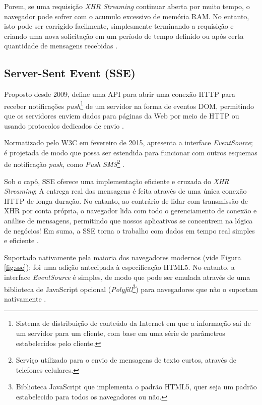 Porem, se uma requisição \emph{XHR Streaming} continuar aberta por muito tempo, o navegador pode sofrer com o acumulo excessivo de memória RAM. No entanto, isto pode ser corrigido facilmente, simplesmente terminando a requisição e criando uma nova solicitação em um período de tempo definido ou após certa quantidade de mensagens recebidas \cite{souders2009even}.

\subsection{Server-Sent Event (SSE)}

Proposto desde 2009, define uma API para abrir uma conexão HTTP para receber notificações \emph{push}\footnote{Sistema de distribuição de conteúdo da Internet em que a informação sai de um servidor para um cliente, com base em uma série de parâmetros estabelecidos pelo cliente.} de um servidor na forma de eventos DOM, permitindo que os servidores enviem dados para páginas da Web por meio de HTTP ou usando protocolos dedicados de envio \cite{hicksonserver2015}.

Normatizado pelo W3C em fevereiro de 2015, apresenta a interface \emph{EventSource}; é projetada de modo que possa ser estendida para funcionar com outros esquemas de notificação \emph{push}, como \emph{Push SMS}\footnote{Serviço utilizado para o envio de mensagens de texto curtos, através de telefones celulares.} \cite{hicksonserver2015}.

\begin{citacao}
	Sob o capô, SSE oferece uma implementação eficiente e cruzada do \emph{XHR Streaming}; A entrega real das mensagens é feita através de uma única conexão HTTP de longa duração. No entanto, ao contrário de lidar com transmissão de XHR por conta própria, o navegador lida com todo o gerenciamento de conexão e análise de mensagens, permitindo que nossos aplicativos se concentrem na lógica de negócios! Em suma, a SSE torna o trabalho com dados em tempo real simples e eficiente \cite[P.~279]{grigorik2013high}.
\end{citacao}

Suportado nativamente pela maioria dos navegadores modernos (vide Figura \ref{fig:sse}); foi uma adição antecipada à especificação HTML5. No entanto, a interface \emph{EventSource} é simples, de modo que pode ser emulada através de uma biblioteca de JavaScript opcional (\emph{Polyfill}\footnote{Biblioteca JavaScript que implementa o padrão HTML5, quer seja um padrão estabelecido para todos os navegadores ou não.}) para navegadores que não o suportam nativamente \cite{grigorik2013high}.

